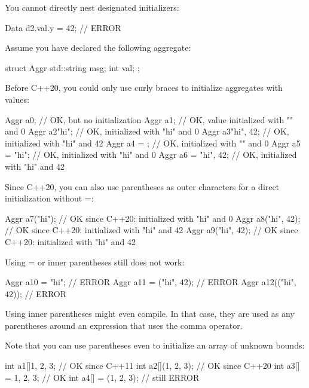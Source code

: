 You cannot directly nest designated initializers:

\begin{cpp}
Data d2{.val.y = 42}; // ERROR
\end{cpp}



Assume you have declared the following aggregate:

\begin{cpp}
struct Aggr {
	std::string msg;
	int val;
};
\end{cpp}

Before C++20, you could only use curly braces to initialize aggregates with values:

\begin{cpp}
Aggr a0; // OK, but no initialization
Aggr a1{}; // OK, value initialized with "" and 0
Aggr a2{"hi"}; // OK, initialized with "hi" and 0
Aggr a3{"hi", 42}; // OK, initialized with "hi" and 42
Aggr a4 = {}; // OK, initialized with "" and 0
Aggr a5 = {"hi"}; // OK, initialized with "hi" and 0
Aggr a6 = {"hi", 42}; // OK, initialized with "hi" and 42
\end{cpp}

Since C++20, you can also use parentheses as outer characters for a direct initialization without =:

\begin{cpp}
Aggr a7("hi"); // OK since C++20: initialized with "hi" and 0
Aggr a8("hi", 42); // OK since C++20: initialized with "hi" and 42
Aggr a9({"hi", 42}); // OK since C++20: initialized with "hi" and 42
\end{cpp}

Using = or inner parentheses still does not work:

\begin{cpp}
Aggr a10 = "hi"; // ERROR
Aggr a11 = ("hi", 42); // ERROR
Aggr a12(("hi", 42)); // ERROR
\end{cpp}

Using inner parentheses might even compile. In that case, they are used as any parentheses around an expression that uses the comma operator.

Note that you can use parentheses even to initialize an array of unknown bounds:

\begin{cpp}
int a1[]{1, 2, 3}; // OK since C++11
int a2[](1, 2, 3); // OK since C++20
int a3[] = {1, 2, 3}; // OK
int a4[] = (1, 2, 3); // still ERROR
\end{cpp}

